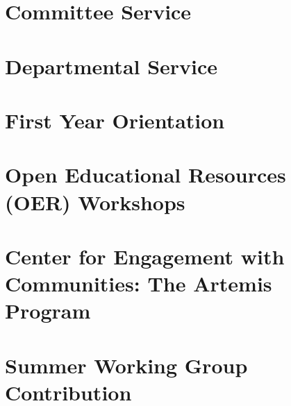 \documentclass[../../main.tex]{subfiles}
\begin{document}
\label{sec:service}

\section{Committee Service}

\begin{flushleft}

\end{flushleft}

\section{Departmental Service}

\begin{flushleft}

\end{flushleft}

\section{First Year Orientation}

\begin{flushleft}

\end{flushleft}

\section{Open Educational Resources (OER) Workshops}

\begin{flushleft}

\end{flushleft}

\section{Center for Engagement with Communities: The Artemis Program}

\begin{flushleft}

\end{flushleft}

\section{Summer Working Group Contribution}

\begin{flushleft}

\end{flushleft}
\end{document}
